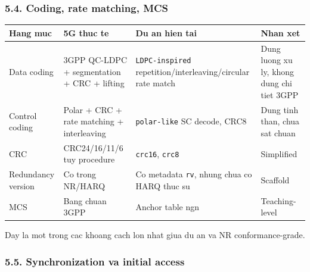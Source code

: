 \documentclass[
  vietnamese,
  a4paper,
  11pt]{article}
\newcounter{none} %
\begin{document}
\subsubsection{5.4. Coding, rate matching,
MCS}\label{coding-rate-matching-mcs}

{\def\LTcaptype{none} %
\begin{longtable}[]{@{}
  >{\raggedright\arraybackslash}p{}
  >{\raggedright\arraybackslash}p{}
  >{\raggedright\arraybackslash}p{}
  >{\raggedright\arraybackslash}p{}@{}}
\toprule\noalign{}
\begin{minipage}[b]{\linewidth}\raggedright
Hang muc
\end{minipage} & \begin{minipage}[b]{\linewidth}\raggedright
5G thuc te
\end{minipage} & \begin{minipage}[b]{\linewidth}\raggedright
Du an hien tai
\end{minipage} & \begin{minipage}[b]{\linewidth}\raggedright
Nhan xet
\end{minipage} \\
\midrule\noalign{}
\endhead
\bottomrule\noalign{}
\endlastfoot
Data coding & 3GPP QC-LDPC + segmentation + CRC + lifting &
\texttt{LDPC-inspired} repetition/interleaving/circular rate match &
Dung luong xu ly, khong dung chi tiet 3GPP \\
Control coding & Polar + CRC + rate matching + interleaving &
\texttt{polar-like} SC decode, CRC8 & Dung tinh than, chua sat chuan \\
CRC & CRC24/16/11/6 tuy procedure & \texttt{crc16}, \texttt{crc8} &
Simplified \\
Redundancy version & Co trong NR/HARQ & Co metadata \texttt{rv}, nhung
chua co HARQ thuc su & Scaffold \\
MCS & Bang chuan 3GPP & Anchor table ngn & Teaching-level \\
\end{longtable}
}

Day la mot trong cac khoang cach lon nhat giua du an va NR
conformance-grade.

\subsubsection{5.5. Synchronization va initial
access}\label{synchronization-va-initial-access}
\end{document}
